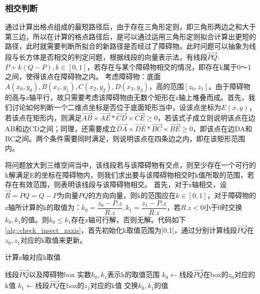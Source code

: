 \FloatBarrier
\subsubsection{相交判断}
\par 通过计算出格点组成的最短路径后，由于存在三角形定则，即三角形两边之和大于第三边，所以在计算的格点路径后，是可以通过运用三角形定则拟合计算出更短的路径，此时就需要判断所拟合的新路径是否经过了障碍物。此时问题可以抽象为线段与长方体是否相交的判定问题，根据线段的向量表示法，有线段$\vec{PQ}$:$P+k(Q-P),k\in [0,1]$，若存在与某个障碍物相交的情况，即存在k属于0～1之间，使得该点在障碍物之内。
考虑障碍物：底面$A(x_0,y_0),B(x_1,y_1),C(x_2,y_2),D(x_3,y_3)$，高的范围$[z_0,z_1]$。由于障碍物的高与z轴平行，故只需要考虑该障碍物由无数个矩形在z轴上堆叠而成。首先，我们讨论如何判断一个二维点坐标是否位于底面矩形当中，设该点坐标为$E(x,y)$，若该点在矩形内，则满足$\vec{AB}\times\vec{AE}*\vec{CD}\times\vec{CE}\ge 0$，若该式子成立则说明该点在边AB和边CD之间；同理，还需要成立$\vec{DA}\times\vec{DE}*\vec{BC}\times\vec{BE}\ge 0$，即该点在边DA和BC之间。两个条件需要同时满足，则说明该点在四条边之内，即在该矩形范围内。
\par 将问题放大到三维空间当中，该线段若与该障碍物有交点，则至少存在一个可行的k解满足E的坐标在障碍物内，则我们求出要与该障碍物相交时k值所取的范围，若存在有效范围，则表明该线段与该障碍物相交。
首先，对于z轴相交，设$\vec{R}=PQ=Q-P$为向量$PQ$的方向向量，则k的范围应在$k\in [0,1]$，对于障碍物的z轴所计算的k的取值为：$k_0=\dfrac{z_0-P.z}{R.z},k_1=\dfrac{z_1-P.z}{R.z}$，若$R.z<0$小于0时交换$k_0,k_1$的值。则$k_0\leq k_1$存在z轴可行解，否则无解。代码如下\ref{alg::check_insect_zaxis}，首先初始化k取值范围为[0,1]，通过分别计算线段$\vec{PQ}$在$z_0,z_1$对应的k取值来更新。
%
\begin{algorithm}[!htb]
    \caption{计算z轴对应k取值}
    \label{alg::check_insect_zaxis}
    \begin{algorithmic}[1] %
        \Require 线段$\vec{PQ}$以及障碍物box
        \Ensure 实数$k_0,k_1$表示k的取值范围
                    \State {}
                \Else
                    \State {}
                \EndIf
            \Else
                \State $k_0 \gets$线段$\vec{PQ}$在box的$z_0$对应的k值
                \State $k_1 \gets$线段$\vec{PQ}$在box的$z_1$对应的k值
                    \State 交换$k_0,k_1$的值
                \EndIf
            \EndIf
            \State {}
        \EndFunction
    \end{algorithmic}
\end{algorithm}
